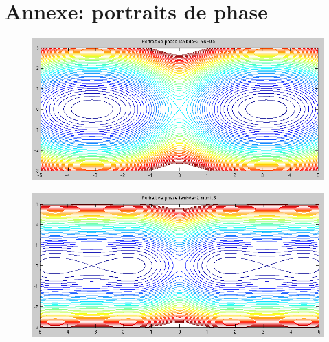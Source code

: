 \documentclass[11pt]{article}
\begin{document}
\section{Annexe: portraits de phase}
\begin{figure}[h!]
	\centering
	\includegraphics[scale=0.64]{Figures/rapport_pp05.png}
\end{figure}

\begin{figure}[h!]
	\centering
	\includegraphics[scale=0.65]{Figures/rapport_pp15.png}
\end{figure}
\end{document}
